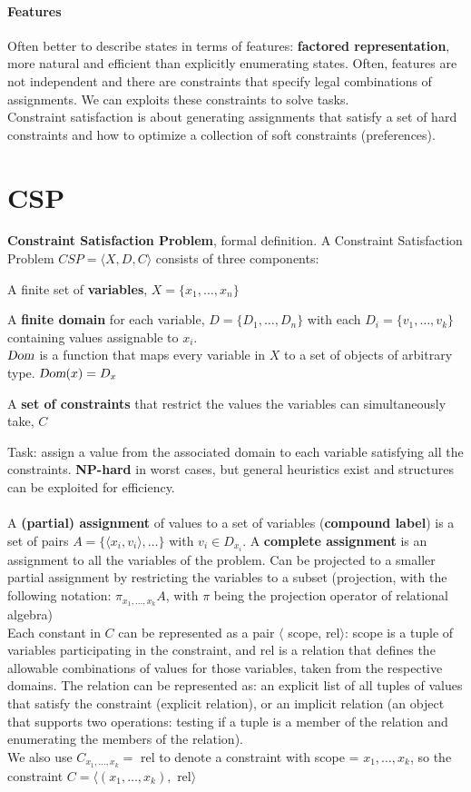 \documentclass[10pt]{report}
\begin{document}
\paragraph{Features} Often better to describe states in terms of features: \textbf{factored representation}, more natural and efficient than explicitly enumerating states. Often, features are not independent and there are constraints that specify legal combinations of assignments. We can exploits these constraints to solve tasks.\\
Constraint satisfaction is about generating assignments that satisfy a set of hard constraints and how to optimize a collection of soft constraints (preferences).
\section{CSP} \textbf{Constraint Satisfaction Problem}, formal definition.
A Constraint Satisfaction Problem $CSP = \langle X, D, C\rangle$ consists of three components: \begin{list}{}{}
	\item A finite set of \textbf{variables}, $X = \{x_1, \ldots, x_n\}$
	\item A \textbf{finite domain} for each variable, $D = \{D_1, \ldots, D_n\}$ with each $D_i = \{v_1, \ldots, v_k\}$ containing values assignable to $x_i$.\\
	$\textsl{Dom}$ is a function that maps every variable in $X$ to a set of objects of arbitrary type. $\textsl{Dom}(x) = D_x$
	\item A \textbf{set of constraints} that restrict the values the variables can simultaneously take, $C$
\end{list}
Task: assign a value from the associated domain to each variable satisfying all the constraints. \textbf{NP-hard} in worst cases, but general heuristics exist and structures can be exploited for efficiency.\\\\
A \textbf{(partial) assignment} of values to a set of variables (\textbf{compound label}) is a set of pairs $A=\{\langle x_i, v_i\rangle, \ldots\}$ with $v_i \in D_{x_i}$. A \textbf{complete assignment} is an assignment to all the variables of the problem. Can be projected to a smaller partial assignment by restricting the variables to a subset (projection, with the following notation: $\pi_{x_1,\ldots,x_k} A$, with $\pi$ being the projection operator of relational algebra)\\
Each constant in $C$ can be represented as a pair $\langle$ scope, rel$\rangle$: scope is a tuple of variables participating in the constraint, and rel is a relation that defines the allowable combinations of values for those variables, taken from the respective domains. The relation can be represented as: an explicit list of all tuples of values that satisfy the constraint (explicit relation), or an implicit relation (an object that supports two operations: testing if a tuple is a member of the relation and enumerating the members of the relation).\\
We also use $C_{x_1,\ldots,x_k} =$ rel to denote a constraint with scope = $x_1,\ldots,x_k$, so the constraint $C=\langle(x_1,\ldots,x_k),$ rel$\rangle$
\end{document}
